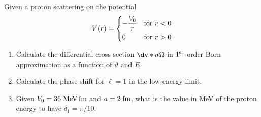 \begin{soluzione}
{   }
\end{soluzione}

\newpage
\setcounter{equation}{0}

\begin{esercizio}
   Given a proton scattering on the potential
   \begin{equation*}
      V(r)=
      \begin{dcases}
         -\frac{V_0}{r} & \text{for } r<0\\
         0 & \text{for } r>0
      \end{dcases}
   \end{equation*}
   \begin{enumerate}[label=\alph*), leftmargin=0.6cm]
      \item Calculate the differential cross section $\dv*{\sigma}{\Omega}$ in $1^{\rm st}$-order Born approximation as a function of $\vartheta$ and $E$.
      \item Calculate the phase shift for $\ell=1$ in the low-energy limit.
      \item Given $V_0=36 \; \rm MeV \, fm$ and $a=2 \; \rm fm$, what is the value in MeV of the proton energy to have $\delta_1=\pi/10$.
   \end{enumerate}
\end{esercizio}
